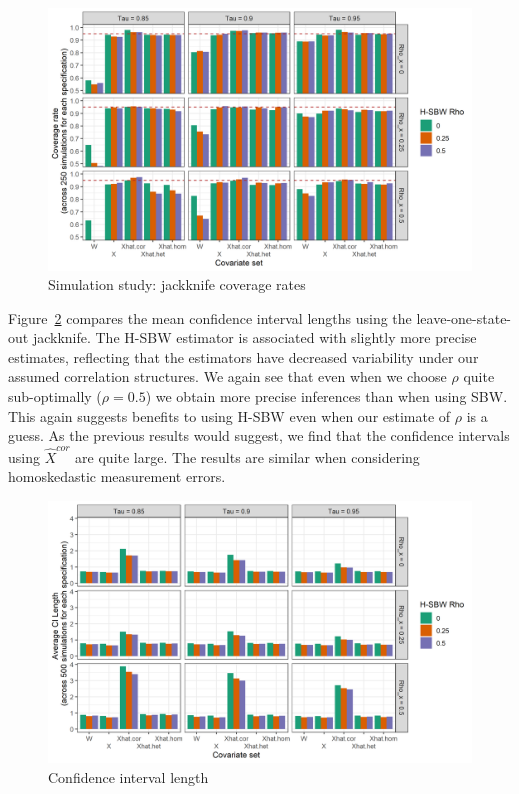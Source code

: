 \begin{figure}[H]
\begin{center}
    \caption{Simulation study: jackknife coverage rates}\label{fig:simcoverage1}
    \includegraphics[scale=0.5]{01_Plots/coverage-plot-1.png}
\end{center}
\end{figure}

Figure~\ref{fig:simcoverage2} compares the mean confidence interval lengths using the leave-one-state-out jackknife. The H-SBW estimator is associated with slightly more precise estimates, reflecting that the estimators have decreased variability under our assumed correlation structures. We again see that even when we choose $\rho$ quite sub-optimally ($\rho = 0.5$) we obtain more precise inferences than when using SBW. This again suggests benefits to using H-SBW even when our estimate of $\rho$ is a guess. As the previous results would suggest, we find that the confidence intervals using $\hat{X}^{cor}$ are quite large. The results are similar when considering homoskedastic measurement errors. 

\begin{figure}[H]
\begin{center}
    \caption{Confidence interval length}\label{fig:simcoverage2}
    \includegraphics[scale=0.5]{01_Plots/ci-length-plot.png}
\end{center}
\end{figure}

